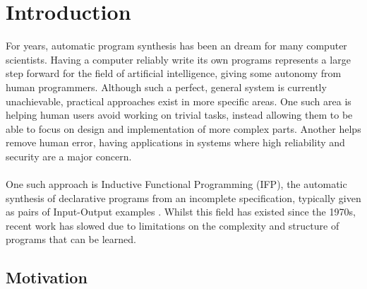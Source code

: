 \chapter{Introduction}
For years, automatic program synthesis has been an dream for many computer scientists. Having a computer reliably write its own programs represents a large step forward for the field of artificial intelligence, giving some autonomy from human programmers. Although such a perfect, general system is currently unachievable, practical approaches exist in more specific areas. One such area is helping human users avoid working on trivial tasks, instead allowing them to be able to focus on design and implementation of more complex parts. Another helps remove human error, having applications in systems where high reliability and security are a major concern. \\ \\ 
One such approach is Inductive Functional Programming (IFP), the automatic synthesis of declarative programs from an incomplete specification, typically given as pairs of Input-Output examples \cite{IFPnotes}. Whilst this field has existed since the 1970s, recent work has slowed due to limitations on the complexity and structure of programs that can be learned. 

\section{Motivation}

